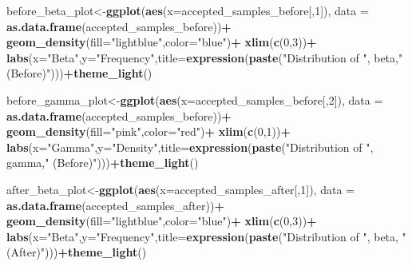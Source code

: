 \documentclass[
]{article}
\newenvironment{Shaded}{\begin{snugshade}}{\end{snugshade}}
\newcommand{\AttributeTok}[1]{\textcolor[rgb]{0.13,0.29,0.53}{#1}}
\newcommand{\DecValTok}[1]{\textcolor[rgb]{0.00,0.00,0.81}{#1}}
\newcommand{\FunctionTok}[1]{\textcolor[rgb]{0.13,0.29,0.53}{\textbf{#1}}}
\newcommand{\NormalTok}[1]{#1}
\newcommand{\OtherTok}[1]{\textcolor[rgb]{0.56,0.35,0.01}{#1}}
\newcommand{\SpecialCharTok}[1]{\textcolor[rgb]{0.81,0.36,0.00}{\textbf{#1}}}
\newcommand{\StringTok}[1]{\textcolor[rgb]{0.31,0.60,0.02}{#1}}
\begin{document}
\begin{Shaded}
\begin{Highlighting}[]
\NormalTok{before\_beta\_plot}\OtherTok{\textless{}{-}}\FunctionTok{ggplot}\NormalTok{(}\FunctionTok{aes}\NormalTok{(}\AttributeTok{x=}\NormalTok{accepted\_samples\_before[,}\DecValTok{1}\NormalTok{]), }\AttributeTok{data =} \FunctionTok{as.data.frame}\NormalTok{(accepted\_samples\_before))}\SpecialCharTok{+}
  \FunctionTok{geom\_density}\NormalTok{(}\AttributeTok{fill=}\StringTok{"lightblue"}\NormalTok{,}\AttributeTok{color=}\StringTok{"blue"}\NormalTok{)}\SpecialCharTok{+}
  \FunctionTok{xlim}\NormalTok{(}\FunctionTok{c}\NormalTok{(}\DecValTok{0}\NormalTok{,}\DecValTok{3}\NormalTok{))}\SpecialCharTok{+}
  \FunctionTok{labs}\NormalTok{(}\AttributeTok{x=}\StringTok{"Beta"}\NormalTok{,}\AttributeTok{y=}\StringTok{"Frequency"}\NormalTok{,}\AttributeTok{title=}\FunctionTok{expression}\NormalTok{(}\FunctionTok{paste}\NormalTok{(}\StringTok{"Distribution of "}\NormalTok{, beta,}\StringTok{"  (Before)"}\NormalTok{)))}\SpecialCharTok{+}\FunctionTok{theme\_light}\NormalTok{()}

\NormalTok{before\_gamma\_plot}\OtherTok{\textless{}{-}}\FunctionTok{ggplot}\NormalTok{(}\FunctionTok{aes}\NormalTok{(}\AttributeTok{x=}\NormalTok{accepted\_samples\_before[,}\DecValTok{2}\NormalTok{]), }\AttributeTok{data =} \FunctionTok{as.data.frame}\NormalTok{(accepted\_samples\_before))}\SpecialCharTok{+}
  \FunctionTok{geom\_density}\NormalTok{(}\AttributeTok{fill=}\StringTok{"pink"}\NormalTok{,}\AttributeTok{color=}\StringTok{"red"}\NormalTok{)}\SpecialCharTok{+}
  \FunctionTok{xlim}\NormalTok{(}\FunctionTok{c}\NormalTok{(}\DecValTok{0}\NormalTok{,}\DecValTok{1}\NormalTok{))}\SpecialCharTok{+}
  \FunctionTok{labs}\NormalTok{(}\AttributeTok{x=}\StringTok{"Gamma"}\NormalTok{,}\AttributeTok{y=}\StringTok{"Density"}\NormalTok{,}\AttributeTok{title=}\FunctionTok{expression}\NormalTok{(}\FunctionTok{paste}\NormalTok{(}\StringTok{"Distribution of "}\NormalTok{, gamma,}\StringTok{" (Before)"}\NormalTok{)))}\SpecialCharTok{+}\FunctionTok{theme\_light}\NormalTok{()}

\NormalTok{after\_beta\_plot}\OtherTok{\textless{}{-}}\FunctionTok{ggplot}\NormalTok{(}\FunctionTok{aes}\NormalTok{(}\AttributeTok{x=}\NormalTok{accepted\_samples\_after[,}\DecValTok{1}\NormalTok{]), }\AttributeTok{data =} \FunctionTok{as.data.frame}\NormalTok{(accepted\_samples\_after))}\SpecialCharTok{+}
  \FunctionTok{geom\_density}\NormalTok{(}\AttributeTok{fill=}\StringTok{"lightblue"}\NormalTok{,}\AttributeTok{color=}\StringTok{"blue"}\NormalTok{)}\SpecialCharTok{+}
  \FunctionTok{xlim}\NormalTok{(}\FunctionTok{c}\NormalTok{(}\DecValTok{0}\NormalTok{,}\DecValTok{3}\NormalTok{))}\SpecialCharTok{+}
  \FunctionTok{labs}\NormalTok{(}\AttributeTok{x=}\StringTok{"Beta"}\NormalTok{,}\AttributeTok{y=}\StringTok{"Frequency"}\NormalTok{,}\AttributeTok{title=}\FunctionTok{expression}\NormalTok{(}\FunctionTok{paste}\NormalTok{(}\StringTok{"Distribution of "}\NormalTok{, beta, }\StringTok{" (After)"}\NormalTok{)))}\SpecialCharTok{+}\FunctionTok{theme\_light}\NormalTok{()}


\end{Highlighting}
\end{Shaded}
\end{document}
